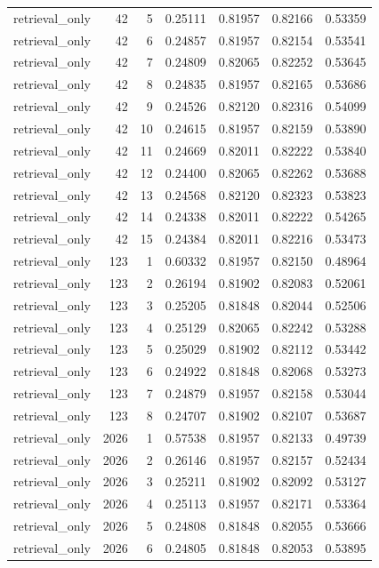 \begin{tabular}{lrrrrrr}
retrieval_only & 42 & 5 & 0.25111 & 0.81957 & 0.82166 & 0.53359 \\
retrieval_only & 42 & 6 & 0.24857 & 0.81957 & 0.82154 & 0.53541 \\
retrieval_only & 42 & 7 & 0.24809 & 0.82065 & 0.82252 & 0.53645 \\
retrieval_only & 42 & 8 & 0.24835 & 0.81957 & 0.82165 & 0.53686 \\
retrieval_only & 42 & 9 & 0.24526 & 0.82120 & 0.82316 & 0.54099 \\
retrieval_only & 42 & 10 & 0.24615 & 0.81957 & 0.82159 & 0.53890 \\
retrieval_only & 42 & 11 & 0.24669 & 0.82011 & 0.82222 & 0.53840 \\
retrieval_only & 42 & 12 & 0.24400 & 0.82065 & 0.82262 & 0.53688 \\
retrieval_only & 42 & 13 & 0.24568 & 0.82120 & 0.82323 & 0.53823 \\
retrieval_only & 42 & 14 & 0.24338 & 0.82011 & 0.82222 & 0.54265 \\
retrieval_only & 42 & 15 & 0.24384 & 0.82011 & 0.82216 & 0.53473 \\
retrieval_only & 123 & 1 & 0.60332 & 0.81957 & 0.82150 & 0.48964 \\
retrieval_only & 123 & 2 & 0.26194 & 0.81902 & 0.82083 & 0.52061 \\
retrieval_only & 123 & 3 & 0.25205 & 0.81848 & 0.82044 & 0.52506 \\
retrieval_only & 123 & 4 & 0.25129 & 0.82065 & 0.82242 & 0.53288 \\
retrieval_only & 123 & 5 & 0.25029 & 0.81902 & 0.82112 & 0.53442 \\
retrieval_only & 123 & 6 & 0.24922 & 0.81848 & 0.82068 & 0.53273 \\
retrieval_only & 123 & 7 & 0.24879 & 0.81957 & 0.82158 & 0.53044 \\
retrieval_only & 123 & 8 & 0.24707 & 0.81902 & 0.82107 & 0.53687 \\
retrieval_only & 2026 & 1 & 0.57538 & 0.81957 & 0.82133 & 0.49739 \\
retrieval_only & 2026 & 2 & 0.26146 & 0.81957 & 0.82157 & 0.52434 \\
retrieval_only & 2026 & 3 & 0.25211 & 0.81902 & 0.82092 & 0.53127 \\
retrieval_only & 2026 & 4 & 0.25113 & 0.81957 & 0.82171 & 0.53364 \\
retrieval_only & 2026 & 5 & 0.24808 & 0.81848 & 0.82055 & 0.53666 \\
retrieval_only & 2026 & 6 & 0.24805 & 0.81848 & 0.82053 & 0.53895 \\

\end{tabular}
